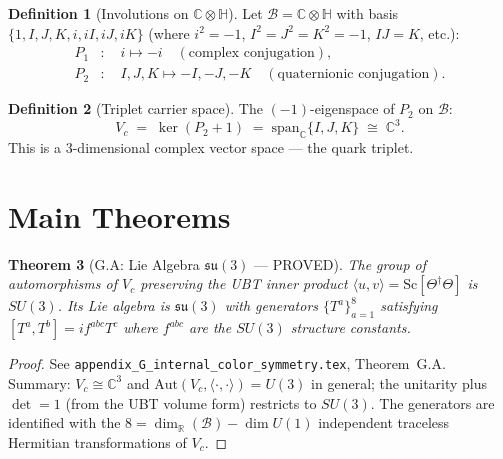 \documentclass[12pt,a4paper]{article}
\newtheorem{theorem}{Theorem}[section]
\theoremstyle{definition}
\newtheorem{definition}[theorem]{Definition}
\theoremstyle{remark}
\begin{document}
\begin{definition}[Involutions on $\mathbb{C}\otimes\mathbb{H}$]
Let $\mathcal{B} = \mathbb{C}\otimes\mathbb{H}$ with basis
$\{1, I, J, K, i, iI, iJ, iK\}$ (where $i^2 = -1$, $I^2 = J^2 = K^2 = -1$,
$IJ = K$, etc.):
\begin{align}
  P_1 &:\quad i \mapsto -i
  \quad (\text{complex conjugation}), \\
  P_2 &:\quad I,J,K \mapsto -I,-J,-K
  \quad (\text{quaternionic conjugation}).
\end{align}
\end{definition}

\begin{definition}[Triplet carrier space]
\label{def:triplet}
The $(-1)$-eigenspace of $P_2$ on $\mathcal{B}$:
\begin{equation}
  V_c \;=\; \ker(P_2 + 1)
       \;=\; \mathrm{span}_\mathbb{C}\{I, J, K\}
       \;\cong\; \mathbb{C}^3.
\end{equation}
This is a 3-dimensional complex vector space --- the quark triplet.
\end{definition}

\section{Main Theorems}
\label{sec:theorems}

\begin{theorem}[G.A: Lie Algebra $\mathfrak{su}(3)$ --- PROVED]
\label{thm:G_A}
The group of automorphisms of $V_c$ preserving the UBT inner product
$\langle u, v\rangle = \mathrm{Sc}[\Theta^\dagger\Theta]$ is $SU(3)$.
Its Lie algebra is $\mathfrak{su}(3)$ with generators
$\{T^a\}_{a=1}^8$ satisfying $[T^a, T^b] = if^{abc}T^c$ where
$f^{abc}$ are the $SU(3)$ structure constants.
\end{theorem}

\begin{proof}
See \texttt{appendix\_G\_internal\_color\_symmetry.tex}, Theorem~G.A.
Summary: $V_c \cong \mathbb{C}^3$ and $\mathrm{Aut}(V_c, \langle\cdot,\cdot\rangle)
= U(3)$ in general; the unitarity plus $\det = 1$ (from the UBT volume form)
restricts to $SU(3)$.  The generators are identified with the $8 = \dim_\mathbb{R}(\mathcal{B}) - \dim U(1)$
independent traceless Hermitian transformations of $V_c$.
\end{proof}
\end{document}
